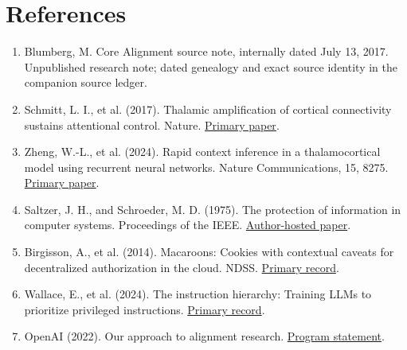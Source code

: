 \documentclass[11pt,letterpaper]{article}
\begin{document}
\section*{References}
\begin{enumerate}[label=\arabic*.,itemsep=0.35em]

\item\label{ref:1}\begingroup{} Blumberg, M. Core Alignment source note, internally dated July 13, 2017. Unpublished research note; dated genealogy and exact source identity in the companion source ledger.\par\endgroup
\item\label{ref:2}\begingroup{} Schmitt, L. I., et al. (2017). Thalamic amplification of cortical connectivity sustains attentional control. Nature. \href{https://pmc.ncbi.nlm.nih.gov/articles/PMC5570520/}{Primary paper}.\par\endgroup
\item\label{ref:3}\begingroup{} Zheng, W.-L., et al. (2024). Rapid context inference in a thalamocortical model using recurrent neural networks. Nature Communications, 15, 8275. \href{https://www.nature.com/articles/s41467-024-52289-3}{Primary paper}.\par\endgroup
\item\label{ref:4}\begingroup{} Saltzer, J. H., and Schroeder, M. D. (1975). The protection of information in computer systems. Proceedings of the IEEE. \href{https://web.mit.edu/Saltzer/www/publications/protection/}{Author-hosted paper}.\par\endgroup
\item\label{ref:5}\begingroup{} Birgisson, A., et al. (2014). Macaroons: Cookies with contextual caveats for decentralized authorization in the cloud. NDSS. \href{https://research.google/pubs/macaroons-cookies-with-contextual-caveats-for-decentralized-authorization-in-the-cloud/}{Primary record}.\par\endgroup
\item\label{ref:6}\begingroup{} Wallace, E., et al. (2024). The instruction hierarchy: Training LLMs to prioritize privileged instructions. \href{https://openai.com/index/the-instruction-hierarchy/}{Primary record}.\par\endgroup
\item\label{ref:7}\begingroup{} OpenAI (2022). Our approach to alignment research. \href{https://openai.com/index/our-approach-to-alignment-research/}{Program statement}.\par\endgroup

\end{enumerate}
\end{document}
